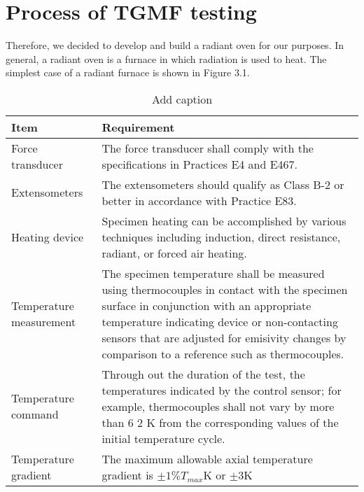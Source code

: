 \section{Process of TGMF testing}
\noindent
Therefore, we decided to develop and build a radiant oven for our purposes. In general, a radiant oven is a furnace in which radiation is used to heat. The simplest case of a radiant furnace is shown in Figure 3.1.

\begin{table}[htbp]
  \centering
  \caption{Add caption}
    \begin{tabular}{p{4cm}p{10cm}}
    \toprule
    Item  & Requirement \\
    \midrule
    Force transducer & The force transducer shall comply with the specifications in Practices E4 and E467. \\
    Extensometers & The extensometers should qualify as Class B-2 or better in accordance with Practice E83. \\
    Heating device & Specimen heating can be accomplished by various techniques including induction, direct resistance, radiant, or forced air heating. \\
    Temperature measurement & The specimen temperature shall be measured using thermocouples in contact with the specimen surface in conjunction with an appropriate temperature indicating device or non-contacting sensors that are adjusted for emisivity changes by comparison to a reference such as thermocouples. \\
    Temperature command & Through out the duration of the test, the temperatures indicated by the control sensor; for example, thermocouples shall not vary by more than 6 2 K from the corresponding values of the initial temperature cycle. \\
    Temperature gradient & The maximum allowable axial temperature gradient is $\pm1\% T_{max}$K or $\pm3$K  \\
    \bottomrule
    \end{tabular}%
  \label{tab:addlabel}%
\end{table}%


